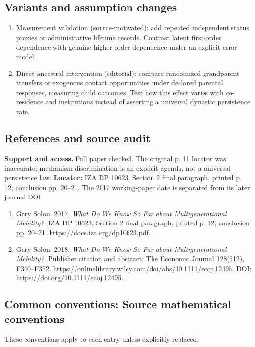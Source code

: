 \documentclass[11pt,a4paper]{article}
\begin{document}
\subsection*{Variants and assumption changes}
\begin{enumerate}
\item Measurement validation (source-motivated): add repeated independent status proxies or administrative lifetime records. Contrast latent first-order dependence with genuine higher-order dependence under an explicit error model.
\item Direct ancestral intervention (editorial): compare randomized grandparent transfers or exogenous contact opportunities under declared parental responses, measuring child outcomes. Test how this effect varies with co-residence and institutions instead of asserting a universal dynastic persistence rate.
\end{enumerate}
\subsection*{References and source audit}
\textbf{Support and access.} Full paper checked. The original p. 11 locator was inaccurate; mechanism discrimination is an explicit agenda, not a universal persistence law. \textbf{Locator:} IZA DP 10623, Section 2 final paragraph, printed p. 12; conclusion pp. 20--21. The 2017 working-paper date is separated from its later journal DOI.
\begin{enumerate}\raggedright
\item\hypertarget{definitions:source:30007646:1}{} Gary Solon. 2017. \emph{What Do We Know So Far about Multigenerational Mobility?}. IZA DP 10623, Section 2 final paragraph, printed p. 12; conclusion pp. 20--21.
\url{https://docs.iza.org/dp10623.pdf}.
\item\hypertarget{definitions:source:30007646:2}{} Gary Solon. 2018. \emph{What Do We Know So Far about Multigenerational Mobility?}. Publisher citation and abstract; The Economic Journal 128(612), F340--F352.
\url{https://onlinelibrary.wiley.com/doi/abs/10.1111/ecoj.12495}.
DOI: \url{https://doi.org/10.1111/ecoj.12495}.
\end{enumerate}

\subsection*{Common conventions: Source mathematical conventions}

These conventions apply to each entry unless explicitly replaced.
\end{document}
